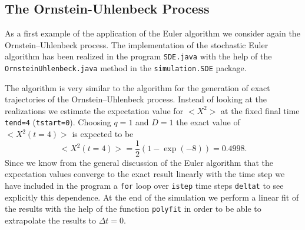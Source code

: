 \subsection{The Ornstein-Uhlenbeck Process}
As a first example of the application of the Euler algorithm
we consider again the Ornstein--Uhlenbeck process.
The implementation of the stochastic Euler algorithm has been 
realized in the program \texttt{SDE.java} with the help
of the \verb|OrnsteinUhlenbeck.java| method in the 
\verb|simulation.SDE| package.




The algorithm is very similar to the algorithm for the generation 
of exact trajectories of the Ornstein--Uhlenbeck process. 
Instead of looking at the realizations we estimate the expectation
value for $<X^2>$ at the fixed final time \texttt{tend=4} 
(\texttt{tstart=0}). Choosing $q=1$ and $D=1$ the exact value of
$<X^2(t=4)>$ is expected to be
\begin{equation*}
<X^2(t=4)> = \frac{1}{2}(1-\exp(-8)) = 0.4998.
\end{equation*}
Since we know from the general discussion of the Euler algorithm
that the expectation values converge to the exact result linearly 
with the time step we have included in the program a \texttt{for}
loop over \texttt{istep} time steps \texttt{deltat} to see explicitly this
dependence. At the end of the simulation we perform a linear fit
of the results with the help of the function \texttt{polyfit} in 
order to be able to extrapolate the results to $\Delta t =0$.

